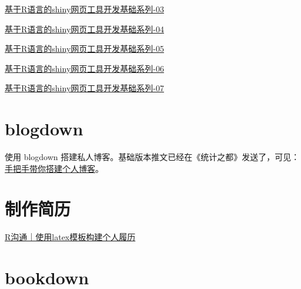 \documentclass[
]{book}
\begin{document}
\href{http://mp.weixin.qq.com/s?__biz=MzI1NjUwMjQxMQ==\&mid=2247490208\&idx=3\&sn=057a8c1b09c6ed8c107833b60f4ae372\&chksm=ea24e544dd536c5264741399a66937849f76874f727e69ccc558073a9ee8398d2de249e67414\&scene=21\#wechat_redirect}{基于R语言的shiny网页工具开发基础系列-03}

\href{http://mp.weixin.qq.com/s?__biz=MzI1NjUwMjQxMQ==\&mid=2247490960\&idx=1\&sn=a30971248a4c2c0e1ce413523f88ef63\&chksm=ea24e274dd536b62a14f33a28571209187ceb122d31a7e7b97855aec190cbe1255a13a40b264\&scene=21\#wechat_redirect}{基于R语言的shiny网页工具开发基础系列-04}

\href{http://mp.weixin.qq.com/s?__biz=MzI1NjUwMjQxMQ==\&mid=2247490960\&idx=2\&sn=12f795a5c8d8abf709d23d0563c0715c\&chksm=ea24e274dd536b6204bcf38c40cdae43334b3b48fbe03e2ebe1c33f4df437158f5f8c6faadc0\&scene=21\#wechat_redirect}{基于R语言的shiny网页工具开发基础系列-05}

\href{http://mp.weixin.qq.com/s?__biz=MzI1NjUwMjQxMQ==\&mid=2247491342\&idx=1\&sn=24db0123fdbb08a45dae3ddf422c1426\&chksm=ea24e0eadd5369fc311057f6fd74ebed034e66009476ce141f2552247d4dfe1626ac29de8626\&scene=21\#wechat_redirect}{基于R语言的shiny网页工具开发基础系列-06}

\href{http://mp.weixin.qq.com/s?__biz=MzI1NjUwMjQxMQ==\&mid=2247491342\&idx=2\&sn=3623e59373731ecd0e2bfdf9be6912c7\&chksm=ea24e0eadd5369fc05627cdc90bb46bcf88439d5306aaa74e925f93aaa31c2f7e37e0c61f76f\&scene=21\#wechat_redirect}{基于R语言的shiny网页工具开发基础系列-07}

\hypertarget{blogdown}{%
\section{blogdown}\label{blogdown}}

使用 blogdown 搭建私人博客。基础版本推文已经在《统计之都》发送了，可见：\href{https://mp.weixin.qq.com/s/S4B5KO_lc3RZNUOqTJjPNQ}{手把手带你搭建个人博客}。

\hypertarget{ux5236ux4f5cux7b80ux5386}{%
\section{制作简历}\label{ux5236ux4f5cux7b80ux5386}}

\href{http://mp.weixin.qq.com/s?__biz=MzI1NjUwMjQxMQ==\&mid=2247493793\&idx=1\&sn=ac5653d10a318d71885e6b1ff3ed3a67\&chksm=ea271745dd509e53173998508ab53dad55d4e2acb22c78afee57ea57bc9950503fdb22bc00d7\&scene=21\#wechat_redirect}{R沟通｜使用latex模板构建个人履历}

\hypertarget{bookdown}{%
\section{bookdown}\label{bookdown}}
\end{document}
